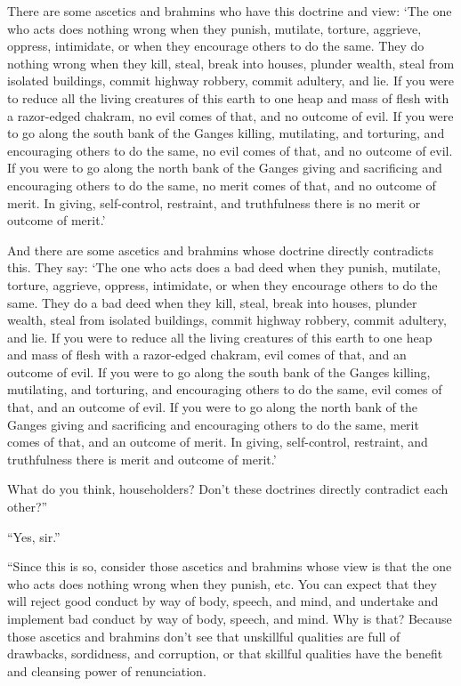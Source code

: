 \documentclass[12pt,openany]{book}%
\begin{document}
There are some ascetics and brahmins who have this doctrine and view: ‘The one who acts does nothing wrong when they punish, mutilate, torture, aggrieve, oppress, intimidate, or when they encourage others to do the same. They do nothing wrong when they kill, steal, break into houses, plunder wealth, steal from isolated buildings, commit highway robbery, commit adultery, and lie. If you were to reduce all the living creatures of this earth to one heap and mass of flesh with a razor-edged chakram, no evil comes of that, and no outcome of evil. If you were to go along the south bank of the Ganges killing, mutilating, and torturing, and encouraging others to do the same, no evil comes of that, and no outcome of evil. If you were to go along the north bank of the Ganges giving and sacrificing and encouraging others to do the same, no merit comes of that, and no outcome of merit. In giving, self-control, restraint, and truthfulness there is no merit or outcome of merit.’ 

And there are some ascetics and brahmins whose doctrine directly contradicts this. They say: ‘The one who acts does a bad deed when they punish, mutilate, torture, aggrieve, oppress, intimidate, or when they encourage others to do the same. They do a bad deed when they kill, steal, break into houses, plunder wealth, steal from isolated buildings, commit highway robbery, commit adultery, and lie. If you were to reduce all the living creatures of this earth to one heap and mass of flesh with a razor-edged chakram, evil comes of that, and an outcome of evil. If you were to go along the south bank of the Ganges killing, mutilating, and torturing, and encouraging others to do the same, evil comes of that, and an outcome of evil. If you were to go along the north bank of the Ganges giving and sacrificing and encouraging others to do the same, merit comes of that, and an outcome of merit. In giving, self-control, restraint, and truthfulness there is merit and outcome of merit.’ 

What do you think, householders? Don’t these doctrines directly contradict each other?” 

“Yes, sir.” 

“Since this is so, consider those ascetics and brahmins whose view is that the one who acts does nothing wrong when they punish, etc. You can expect that they will reject good conduct by way of body, speech, and mind, and undertake and implement bad conduct by way of body, speech, and mind. Why is that? Because those ascetics and brahmins don’t see that unskillful qualities are full of drawbacks, sordidness, and corruption, or that skillful qualities have the benefit and cleansing power of renunciation. 
\end{document}
